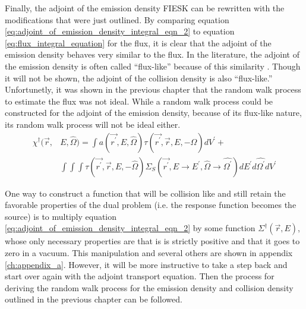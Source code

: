Finally, the adjoint of the emission density FIESK can be rewritten with the 
modifications that were just outlined. By comparing equation
\ref{eq:adjoint_of_emission_density_integral_eqn_2} to equation 
\ref{eq:flux_integral_equation} for the flux, it is clear that
the adjoint of the emission density behaves very similar to the flux. In the 
literature, the adjoint of the emission density is often called ``flux-like'' 
because of this similarity \citep{hoogenboom}. Though it will not be shown, 
the adjoint of the collision density is also ``flux-like.'' Unfortunetly, it 
was shown in the previous chapter that the random walk process to estimate the 
flux was not ideal. While a random walk process could be constructed for the 
adjoint of the emission density, because of its flux-like nature, its random 
walk process will not be ideal either. 
\begin{equation}
  \begin{split}
    \chi^{\dagger}(\vec{r},&E,\hat{\Omega}) =  \int a(\vec{r^{'}},E,\hat{\Omega}) 
    \tau(\vec{r^{'}},\vec{r},E,-\hat{\Omega}) dV^{'} + \\
    & \int\int\int  \tau(\vec{r^{'}},\vec{r},E,-\hat{\Omega}) 
    \Sigma_S(\vec{r^{'}},E \to E^{'},\hat{\Omega} \to \hat{\Omega^{'}})
    dE^{'}d\hat{\Omega^{'}}dV^{'}
  \end{split}
  \label{eq:adjoint_of_emission_density_integral_eqn_2}
\end{equation}

One way to construct a function that will be collision like and still retain
the favorable properties of the dual problem (i.e. the response function 
becomes the source) is to multiply equation 
\ref{eq:adjoint_of_emission_density_integral_eqn_2} by some function 
$\Sigma^{\dagger}(\vec{r},E)$, whose only necessary properties are that is is
strictly positive and that it goes to zero in a vacuum. This manipulation and 
several others are shown in appendix \ref{ch:appendix_a}. However, it will be 
more instructive to take a step back and start over again with the adjoint 
transport equation. Then the process for deriving the random walk process for 
the emission density and collision density outlined in the previous chapter 
can be followed. 

